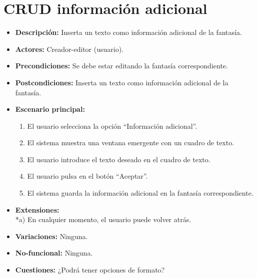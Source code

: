 \documentclass[12pt,letterpaper]{article}
\begin{document}
\section{CRUD información adicional}
\begin{itemize}
	\item \textbf{Descripción:} Inserta un texto como información adicional de la fantasía.
	\item \textbf{Actores:} Creador-editor (usuario).
	\item \textbf{Precondiciones:} Se debe estar editando la fantasía correspondiente.
	\item \textbf{Postcondiciones:} Inserta un texto como información adicional de la fantasía.
	\item \textbf{Escenario principal:}
	\begin{enumerate}
		\item El usuario selecciona la opción ``Información adicional''.
		\item El sistema muestra una ventana emergente con un cuadro de texto.
		\item El usuario introduce el texto deseado en el cuadro de texto. 
		\item El usuario pulsa en el botón ``Aceptar''.
		\item El sistema guarda la información adicional en la fantasía correspondiente.
	\end{enumerate}
	\item \textbf{Extensiones:} \\ *a) En cualquier momento, el usuario puede volver atrás.
	\item \textbf{Variaciones:} Ninguna.
	\item \textbf{No-funcional:} Ninguna.
	\item \textbf{Cuestiones:} ¿Podrá tener opciones de formato?
\end{itemize}
\end{document}
